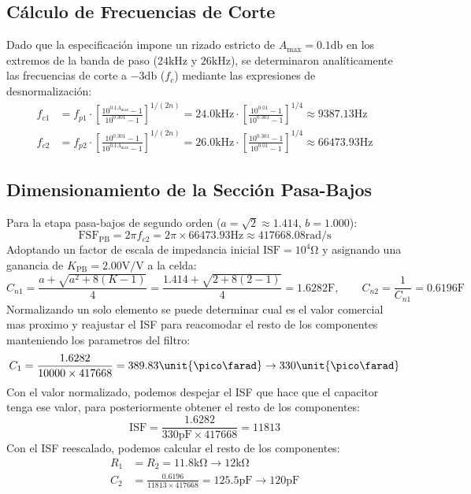 \subsection{Cálculo de Frecuencias de Corte}
Dado que la especificación impone un rizado estricto de $A_{\max} = 0.1 \unit{\decibel}$ en los extremos de la banda
de paso ($24 \unit{\kilo\hertz}$ y $26 \unit{\kilo\hertz}$), se determinaron analíticamente las frecuencias de corte
a $-3 \unit{\decibel}$ ($f_c$) mediante las expresiones de desnormalización:
\begin{align*}
    f_{c1} &= f_{p1} \cdot \left[ \frac{10^{0.1 A_{\max}} - 1}{10^{0.301} - 1} \right]^{1/(2n)} = 24.0 \unit{\kilo\hertz} \cdot \left[ \frac{10^{0.01} - 1}{10^{0.301} - 1} \right]^{1/4} \approx 9387.13 \unit{\hertz} \\
    f_{c2} &= f_{p2} \cdot \left[ \frac{10^{0.301} - 1}{10^{0.1 A_{\max}} - 1} \right]^{1/(2n)} = 26.0 \unit{\kilo\hertz} \cdot \left[ \frac{10^{0.301} - 1}{10^{0.01} - 1} \right]^{1/4} \approx 66473.93 \unit{\hertz}
\end{align*}

\subsection{Dimensionamiento de la Sección Pasa-Bajos}
Para la etapa pasa-bajos de segundo orden ($a = \sqrt{2} \approx 1.414$, $b = 1.000$):
\begin{equation*}
    \text{FSF}_{\text{PB}} = 2\pi f_{c2} = 2\pi \times 66473.93 \unit{\hertz} \approx 417668.08 \unit{\radian\per\second}
\end{equation*}
Adoptando un factor de escala de impedancia inicial $\text{ISF} = 10^4 \unit{\ohm}$ y asignando una ganancia de
$K_{\text{PB}} = 2.00 \unit{\volt\per\volt}$ a la celda:
\begin{equation*}
    C_{n1} = \frac{a + \sqrt{a^2 + 8(K - 1)}}{4} = \frac{1.414 + \sqrt{2 + 8(2 - 1)}}{4} = 1.6282 \unit{\farad}, \qquad C_{n2} = \frac{1}{C_{n1}} = 0.6196 \unit{\farad}
\end{equation*}
Normalizando un solo elemento se puede determinar cual es el valor comercial mas proximo y reajustar el ISF para
reacomodar el resto de los componentes manteniendo los parametros del filtro:
\begin{equation*}
    C_1 = \frac{1.6282}{10000 \times 417668} = 389.83 \unit{\pico\farad} \to 330 \unit{\pico\farad} \\
\end{equation*}
Con el valor normalizado, podemos despejar el ISF que hace que el capacitor tenga ese valor, para posteriormente obtener
el resto de los componentes:
\begin{equation*}
    \text{ISF} = \frac{1.6282}{330 \unit{\pico\farad} \times 417668} = 11813
\end{equation*}
Con el ISF reescalado, podemos calcular el resto de los componentes:
\begin{align*}
    R_1 &= R_2 = 11.8 \unit{\kilo\ohm} \to 12 \unit{\kilo\ohm}\\
    C_2 &= \frac{0.6196}{11813 \times 417668} = 125.5 \unit{\pico\farad} \to 120 \unit{\pico\farad}
\end{align*}

